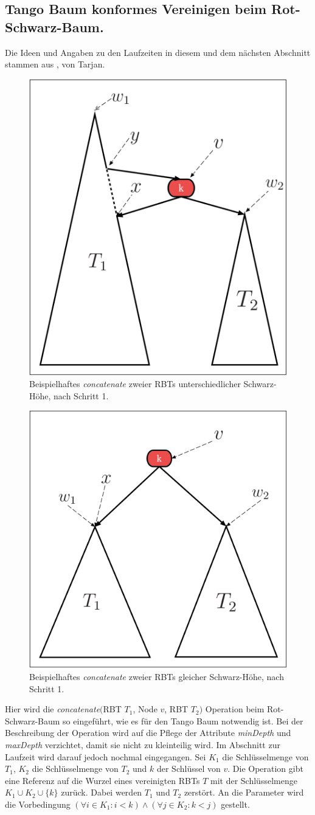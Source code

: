 \documentclass[a4paper,12pt]{article}
\begin{document}
\subsection{Tango Baum konformes Vereinigen beim Rot-Schwarz-Baum.} \label{vereinigen}
Die Ideen und Angaben zu den Laufzeiten in diesem und dem nächsten Abschnitt stammen aus \cite{conSplit}, von Tarjan.
\begin{figure}[H]
	\centering
	\includegraphics[height= 0.6\textwidth]{Medien/RotSchwarzBaum/vereinigen}
	\caption{Beispielhaftes \textit{concatenate} zweier RBTs unterschiedlicher Schwarz-Höhe, nach Schritt 1. }
	\label{fig:vereinigen}
\end{figure}
\begin{figure}[H]
	\centering
	\includegraphics[height= 0.6\textwidth]{Medien/RotSchwarzBaum/vereinigen2}
	\caption{Beispielhaftes \textit{concatenate} zweier RBTs gleicher Schwarz-Höhe, nach Schritt 1. }
	\label{fig:vereinigen2}
\end{figure}
\noindent Hier wird die \textit{concatenate}$($RBT $T_1$, Node $v$, RBT $T_2)$ Operation beim Rot-Schwarz-Baum so eingeführt, wie es für den Tango Baum notwendig ist. Bei der Beschreibung der Operation wird auf die Pflege der Attribute  \textit{minDepth} und \textit{maxDepth} verzichtet, damit sie nicht zu kleinteilig wird. Im Abschnitt zur Laufzeit wird darauf jedoch nochmal eingegangen. Sei $K_1$ die Schlüsselmenge von $T_1$, $K_2$ die Schlüsselmenge von $T_2$ und $k$ der Schlüssel von $v$. Die Operation gibt eine Referenz auf die Wurzel eines vereinigten RBTs $T$ mit der Schlüsselmenge $K_1 \cup K_2 \cup \{k\} $ zurück. Dabei werden $T_1$ und $T_2$ zerstört. An die Parameter wird die Vorbedingung $(\forall i \in K_1: i < k ) \land (\forall j \in K_2: k < j )$ gestellt.\\
\end{document}
